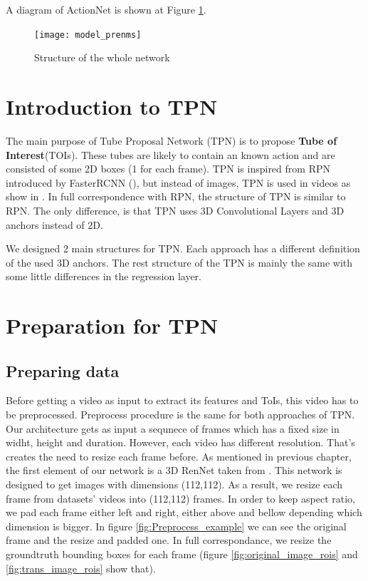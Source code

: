 A diagram of ActionNet is shown at Figure \ref{fig:whole_network_}.

\begin{figure}[h]
  \centering
  \texttt{[image: model\_prenms]}
  \caption{Structure of the whole network}
  \label{fig:whole_network_}
\end{figure}

\section{Introduction to TPN}
 The main purpose of Tube Proposal Network (TPN)  is to propose
\textbf{Tube of Interest}(TOIs). These tubes are likely to contain an known action and are consisted of some 2D boxes
(1 for each frame). TPN is inspired from RPN introduced by FasterRCNN (\cite{Ren:2015:FRT:2969239.2969250}), but instead of images, TPN
is used in videos as show in \cite{DBLP:journals/corr/HouCS17}. In full correspondence with RPN, the structure
of TPN is similar to RPN. The only difference, is that TPN uses 3D Convolutional Layers and 3D anchors instead of 2D. \par
We designed 2 main structures for TPN. Each approach has a different definition of the used 3D anchors.
The rest structure of the TPN is mainly the same with some little differences in the regression layer. \par

\section{Preparation for TPN}

\subsection{Preparing data}
Before getting a video as input to extract its features and ToIs, this video has to be preprocessed.
Preprocess procedure  is the same for both approaches of TPN.
Our architecture gets as input a sequnece of frames which has a fixed size in widht, height and duration. However, each video has different resolution. That's creates the
need to resize each frame before. As mentioned in previous chapter, the first element of our network is a 3D RenNet taken from \cite{hara3dcnns}. This network is designed to
get images with dimensions (112,112). As a result, we resize each frame from datasets' videos into (112,112) frames. In order to keep aspect ratio, we pad each frame either
left and right, either above and bellow depending which dimension is bigger. In figure  \ref{fig:Preprocess_example} we can see the original frame and the resize and padded one.
In full correspondance, we resize the groundtruth bounding boxes for each frame (figure \ref{fig:original_image_rois} and \ref{fig:trans_image_rois} show that).

